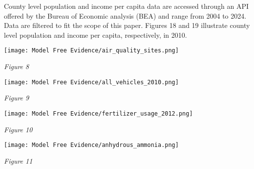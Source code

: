 \documentclass[12pt]{article}
\newcommand\tab[1][.50cm]{\hspace*{#1}}
\newenvironment{Figure}
{\par\medskip\noindent\minipage{\linewidth}}
{\endminipage\par\medskip}
\begin{document}
\begin{multicols}{2}
		\tab County level population and income per capita data are accessed through an API offered by the Bureau of Economic analysis (BEA) and range from 2004 to 2024. Data are filtered to fit the scope of this paper. Figures 18 and 19 illustrate county level population and income per capita, respectively, in 2010.  \\ 
		
		
	\end{multicols}
	
	\begin{multicols}{2}
		
		
		\begin{Figure}
			\centering
			\texttt{[image: Model Free Evidence/air\_quality\_sites.png]}
			
		\end{Figure}
		\begin{center}
			\emph{Figure 8}\\
		\end{center}
		
		
		
		\begin{Figure}
			\centering
			\texttt{[image: Model Free Evidence/all\_vehicles\_2010.png]}
			
		\end{Figure}
		\begin{center}
			\emph{Figure 9}\\
		\end{center}
		
		
		
		
		\begin{Figure}
			\centering
			\texttt{[image: Model Free Evidence/fertilizer\_usage\_2012.png]}
			
		\end{Figure}
		\begin{center}
			\emph{Figure 10}\\
		\end{center}
		
		
		
		
		\begin{Figure}
			\centering
			\texttt{[image: Model Free Evidence/anhydrous\_ammonia.png]}
			
		\end{Figure}
		\begin{center}
			\emph{Figure 11}\\
		\end{center}
		

\end{multicols}
\end{document}
